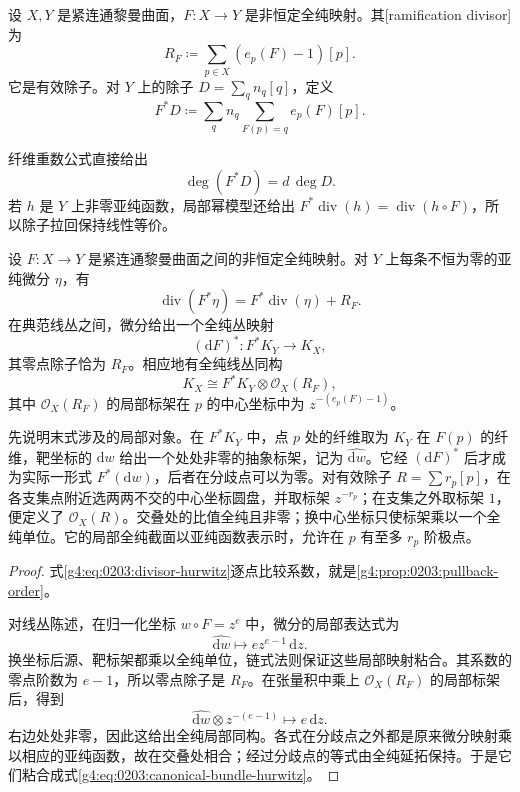 \begin{definition}
	\label{g4:def:0203:ramification-divisor}
	设 \(X,Y\) 是紧连通黎曼曲面，\(F:X\rightarrow Y\) 是非恒定全纯映射。其[ramification divisor]为
	\[
		R_F\coloneqq\sum_{p\in X}(e_p(F)-1)[p].
	\]
	它是有效除子。对 \(Y\) 上的除子 \(D=\sum_q n_q[q]\)，定义
	\[
		F^*D\coloneqq\sum_q n_q\sum_{F(p)=q}e_p(F)[p].
	\]
\end{definition}

纤维重数公式直接给出
\begin{equation}
	\label{g4:eq:0203:divisor-degree-pullback}
	\deg(F^*D)=d\,\deg D.
\end{equation}
若 \(h\) 是 \(Y\) 上非零亚纯函数，局部幂模型还给出 \(F^*\operatorname{div}(h)=\operatorname{div}(h\circ F)\)，所以除子拉回保持线性等价。

\begin{theorem}
	\label{g4:thm:0203:divisor-hurwitz}
	设 \(F:X\rightarrow Y\) 是紧连通黎曼曲面之间的非恒定全纯映射。对 \(Y\) 上每条不恒为零的亚纯微分 \(\eta\)，有
	\begin{equation}
		\label{g4:eq:0203:divisor-hurwitz}
		\operatorname{div}(F^*\eta)
		=F^*\operatorname{div}(\eta)+R_F.
	\end{equation}
	在典范线丛之间，微分给出一个全纯丛映射
	\[
		(\mathrm{d}F)^*:F^*K_Y\longrightarrow K_X,
	\]
	其零点除子恰为 \(R_F\)。相应地有全纯线丛同构
	\begin{equation}
		\label{g4:eq:0203:canonical-bundle-hurwitz}
		K_X\cong F^*K_Y\otimes\mathcal O_X(R_F),
	\end{equation}
	其中 \(\mathcal O_X(R_F)\) 的局部标架在 \(p\) 的中心坐标中为 \(z^{-(e_p(F)-1)}\)。
\end{theorem}

先说明末式涉及的局部对象。在 \(F^*K_Y\) 中，点 \(p\) 处的纤维取为 \(K_Y\) 在 \(F(p)\) 的纤维，靶坐标的 \(\mathrm{d}w\) 给出一个处处非零的抽象标架，记为 \(\widehat{\mathrm{d}w}\)。它经 \((\mathrm{d}F)^*\) 后才成为实际一形式 \(F^*(\mathrm{d}w)\)，后者在分歧点可以为零。对有效除子 \(R=\sum r_p[p]\)，在各支集点附近选两两不交的中心坐标圆盘，并取标架 \(z^{-r_p}\)；在支集之外取标架 \(1\)，便定义了 \(\mathcal O_X(R)\)。交叠处的比值全纯且非零；换中心坐标只使标架乘以一个全纯单位。它的局部全纯截面以亚纯函数表示时，允许在 \(p\) 有至多 \(r_p\) 阶极点。

\begin{proof}
	式\eqref{g4:eq:0203:divisor-hurwitz}逐点比较系数，就是\cref{g4:prop:0203:pullback-order}。

	对线丛陈述，在归一化坐标 \(w\circ F=z^e\) 中，微分的局部表达式为
	\[
		\widehat{\mathrm{d}w}\longmapsto e z^{e-1}\,\mathrm{d}z.
	\]
	换坐标后源、靶标架都乘以全纯单位，链式法则保证这些局部映射粘合。其系数的零点阶数为 \(e-1\)，所以零点除子是 \(R_F\)。在张量积中乘上 \(\mathcal O_X(R_F)\) 的局部标架后，得到
	\[
		\widehat{\mathrm{d}w}\otimes z^{-(e-1)}
		\longmapsto e\,\mathrm{d}z.
	\]
	右边处处非零，因此这给出全纯局部同构。各式在分歧点之外都是原来微分映射乘以相应的亚纯函数，故在交叠处相合；经过分歧点的等式由全纯延拓保持。于是它们粘合成式\eqref{g4:eq:0203:canonical-bundle-hurwitz}。
\end{proof}

